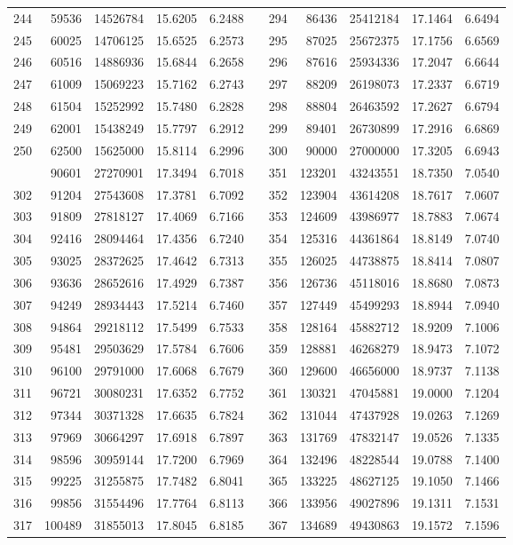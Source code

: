 \begin{longtable}{rrrrrrrrrrr}
244&59536&14526784&15.6205&6.2488&&294&86436&25412184&17.1464&6.6494\\
245&60025&14706125&15.6525&6.2573&&295&87025&25672375&17.1756&6.6569\\
246&60516&14886936&15.6844&6.2658&&296&87616&25934336&17.2047&6.6644\\
247&61009&15069223&15.7162&6.2743&&297&88209&26198073&17.2337&6.6719\\
248&61504&15252992&15.7480&6.2828&&298&88804&26463592&17.2627&6.6794\\
249&62001&15438249&15.7797&6.2912&&299&89401&26730899&17.2916&6.6869\\
250&62500&15625000&15.8114&6.2996&&300&90000&27000000&17.3205&6.6943\\
\newpage
301&90601&27270901&17.3494&6.7018&&351&123201&43243551&18.7350&7.0540\\
302&91204&27543608&17.3781&6.7092&&352&123904&43614208&18.7617&7.0607\\
303&91809&27818127&17.4069&6.7166&&353&124609&43986977&18.7883&7.0674\\
304&92416&28094464&17.4356&6.7240&&354&125316&44361864&18.8149&7.0740\\
305&93025&28372625&17.4642&6.7313&&355&126025&44738875&18.8414&7.0807\\
306&93636&28652616&17.4929&6.7387&&356&126736&45118016&18.8680&7.0873\\
307&94249&28934443&17.5214&6.7460&&357&127449&45499293&18.8944&7.0940\\
308&94864&29218112&17.5499&6.7533&&358&128164&45882712&18.9209&7.1006\\
309&95481&29503629&17.5784&6.7606&&359&128881&46268279&18.9473&7.1072\\
310&96100&29791000&17.6068&6.7679&&360&129600&46656000&18.9737&7.1138\\
311&96721&30080231&17.6352&6.7752&&361&130321&47045881&19.0000&7.1204\\
312&97344&30371328&17.6635&6.7824&&362&131044&47437928&19.0263&7.1269\\
313&97969&30664297&17.6918&6.7897&&363&131769&47832147&19.0526&7.1335\\
314&98596&30959144&17.7200&6.7969&&364&132496&48228544&19.0788&7.1400\\
315&99225&31255875&17.7482&6.8041&&365&133225&48627125&19.1050&7.1466\\
316&99856&31554496&17.7764&6.8113&&366&133956&49027896&19.1311&7.1531\\
317&100489&31855013&17.8045&6.8185&&367&134689&49430863&19.1572&7.1596\\

\end{longtable}
